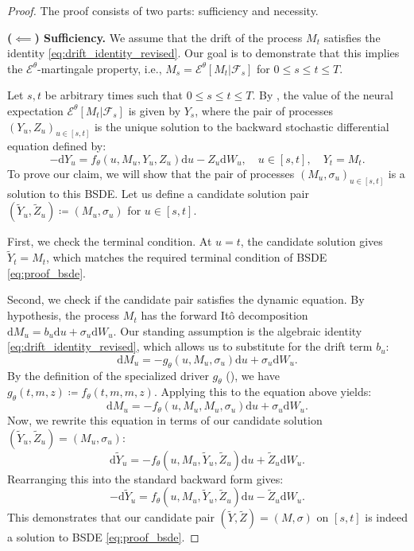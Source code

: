 \documentclass[qian]{imsart}
\newcommand{\Fcal}{\mathcal{F}}
\newcommand{\cEneutheta}{\mathcal{E}^{\theta}}
\newcommand{\dd}{\mathrm{d}}
\theoremstyle{plain}
\theoremstyle{definition}
\begin{document}
\begin{proof}
The proof consists of two parts: sufficiency and necessity.

\textbf{($\impliedby$) Sufficiency.}
We assume that the drift of the process $M_t$ satisfies the identity \eqref{eq:drift_identity_revised}. Our goal is to demonstrate that this implies the $\cEneutheta$-martingale property, i.e., $M_s = \cEneutheta[M_t | \Fcal_s]$ for $0 \le s \le t \le T$.

Let $s, t$ be arbitrary times such that $0 \le s \le t \le T$. By , the value of the neural expectation $\cEneutheta[M_t | \Fcal_s]$ is given by $Y_s$, where the pair of processes $(Y_u, Z_u)_{u \in [s,t]}$ is the unique solution to the backward stochastic differential equation defined by:
\begin{equation} \label{eq:proof_bsde}
    -\dd Y_u = f_\theta(u, M_u, Y_u, Z_u) \dd u - Z_u \dd W_u, \quad u \in [s,t], \quad Y_t = M_t.
\end{equation}
To prove our claim, we will show that the pair of processes $(M_u, \sigma_u)_{u \in [s,t]}$ is a solution to this BSDE. Let us define a candidate solution pair $(\tilde{Y}_u, \tilde{Z}_u) \coloneqq (M_u, \sigma_u)$ for $u \in [s,t]$.

First, we check the terminal condition. At $u=t$, the candidate solution gives $\tilde{Y}_t = M_t$, which matches the required terminal condition of BSDE \eqref{eq:proof_bsde}.

Second, we check if the candidate pair satisfies the dynamic equation. By hypothesis, the process $M_t$ has the forward Itô decomposition $\dd M_u = b_u \dd u + \sigma_u \dd W_u$. Our standing assumption is the algebraic identity \eqref{eq:drift_identity_revised}, which allows us to substitute for the drift term $b_u$:
\[
    \dd M_u = -g_\theta(u, M_u, \sigma_u) \dd u + \sigma_u \dd W_u.
\]
By the definition of the specialized driver $g_\theta$ (), we have $g_\theta(t, m, z) \coloneqq f_\theta(t, m, m, z)$. Applying this to the equation above yields:
\[
    \dd M_u = -f_\theta(u, M_u, M_u, \sigma_u) \dd u + \sigma_u \dd W_u.
\]
Now, we rewrite this equation in terms of our candidate solution $(\tilde{Y}_u, \tilde{Z}_u) = (M_u, \sigma_u)$:
\[
    \dd \tilde{Y}_u = -f_\theta(u, M_u, \tilde{Y}_u, \tilde{Z}_u) \dd u + \tilde{Z}_u \dd W_u.
\]
Rearranging this into the standard backward form gives:
\[
    -\dd \tilde{Y}_u = f_\theta(u, M_u, \tilde{Y}_u, \tilde{Z}_u) \dd u - \tilde{Z}_u \dd W_u.
\]
This demonstrates that our candidate pair $(\tilde{Y}, \tilde{Z}) = (M, \sigma)$ on $[s,t]$ is indeed a solution to BSDE \eqref{eq:proof_bsde}.


\end{proof}
\end{document}
